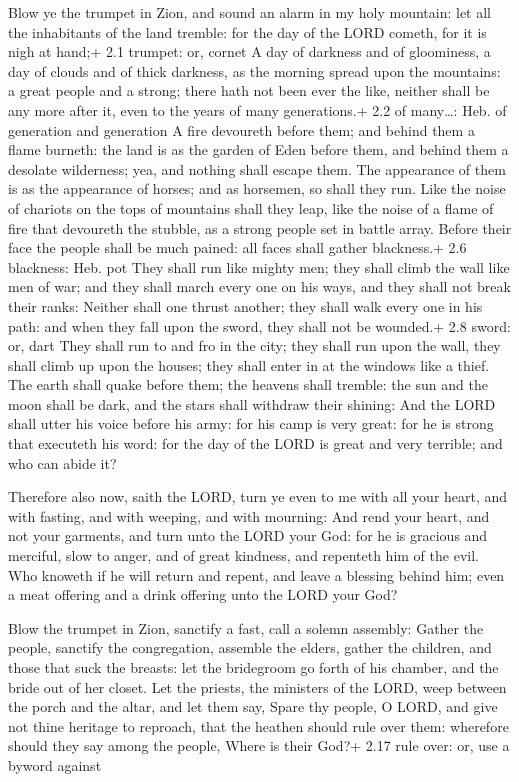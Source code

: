  Blow ye the trumpet in Zion, and sound an alarm in my holy
mountain: let all the inhabitants of the land tremble: for the day of
the LORD cometh, for it is nigh at hand;+ 2.1 trumpet: or, cornet
 A day of darkness and of gloominess, a day of clouds and of
thick darkness, as the morning spread upon the mountains: a great people
and a strong; there hath not been ever the like, neither shall be any
more after it, even to the years of many generations.+ 2.2 of
many\ldots: Heb. of generation and generation  A fire
devoureth before them; and behind them a flame burneth: the land is as
the garden of Eden before them, and behind them a desolate wilderness;
yea, and nothing shall escape them.  The appearance of them
is as the appearance of horses; and as horsemen, so shall they run.
 Like the noise of chariots on the tops of mountains shall
they leap, like the noise of a flame of fire that devoureth the stubble,
as a strong people set in battle array.  Before their face
the people shall be much pained: all faces shall gather blackness.+ 2.6
blackness: Heb. pot  They shall run like mighty men; they
shall climb the wall like men of war; and they shall march every one on
his ways, and they shall not break their ranks:  Neither
shall one thrust another; they shall walk every one in his path: and
when they fall upon the sword, they shall not be wounded.+ 2.8 sword:
or, dart  They shall run to and fro in the city; they shall
run upon the wall, they shall climb up upon the houses; they shall enter
in at the windows like a thief.  The earth shall quake
before them; the heavens shall tremble: the sun and the moon shall be
dark, and the stars shall withdraw their shining:  And the
LORD shall utter his voice before his army: for his camp is very great:
for he is strong that executeth his word: for the day of the LORD is
great and very terrible; and who can abide it?

 Therefore also now, saith the LORD, turn ye even to me
with all your heart, and with fasting, and with weeping, and with
mourning:  And rend your heart, and not your garments, and
turn unto the LORD your God: for he is gracious and merciful, slow to
anger, and of great kindness, and repenteth him of the evil.
 Who knoweth if he will return and repent, and leave a
blessing behind him; even a meat offering and a drink offering unto the
LORD your God?

 Blow the trumpet in Zion, sanctify a fast, call a solemn
assembly:  Gather the people, sanctify the congregation,
assemble the elders, gather the children, and those that suck the
breasts: let the bridegroom go forth of his chamber, and the bride out
of her closet.  Let the priests, the ministers of the LORD,
weep between the porch and the altar, and let them say, Spare thy
people, O LORD, and give not thine heritage to reproach, that the
heathen should rule over them: wherefore should they say among the
people, Where is their God?+ 2.17 rule over: or, use a byword against

